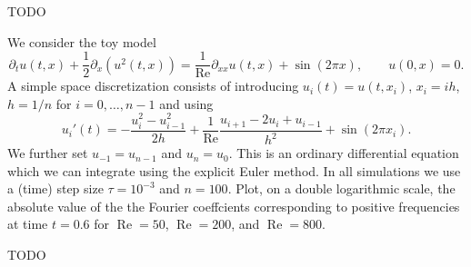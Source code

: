 \documentclass[12pt]{exam}
\newcommand{\del}{\partial}
\begin{document}
\begin{questions}
    \begin{solution}
        {\color{red} TODO}
    \end{solution}
    
    
    \question We consider the toy model
    \begin{equation*}
        \del_t u(t,x) + \frac{1}{2} \del_x(u^2(t,x)) = \frac{1}{\text{Re}} \del_{xx} u(t,x) + \sin(2 \pi x), \qquad u(0,x) = 0.
    \end{equation*}
    A simple space discretization consists of introducing $u_i(t) = u(t, x_i)$, $x_i = ih$, $h = 1/n$ for $i = 0, \ldots, n - 1$ and using
    \begin{equation*}
        u_i'(t) = - \frac{u_i^2 - u_{i-1}^2}{2h} + \frac{1}{\text{Re}} \frac{u_{i+1} - 2u_i + u_{i-1}}{h^2} + \sin(2 \pi x_i).
    \end{equation*}
    We further set $u_{-1} = u_{n-1}$ and $u_n = u_0$. This is an ordinary differential equation which we can integrate using the explicit Euler method. In all simulations we use a (time) step size $\tau = 10^{-3}$ and $n = 100$. \newline
    Plot, on a double logarithmic scale, the absolute value of the the Fourier coeffcients corresponding to positive frequencies at time $t = 0.6$ for $\operatorname{Re} = 50$, $\operatorname{Re} = 200$, and $\operatorname{Re} = 800$.
    
    \begin{solution}
        {\color{red} TODO}
    \end{solution}
    
\end{questions}
\end{document}

